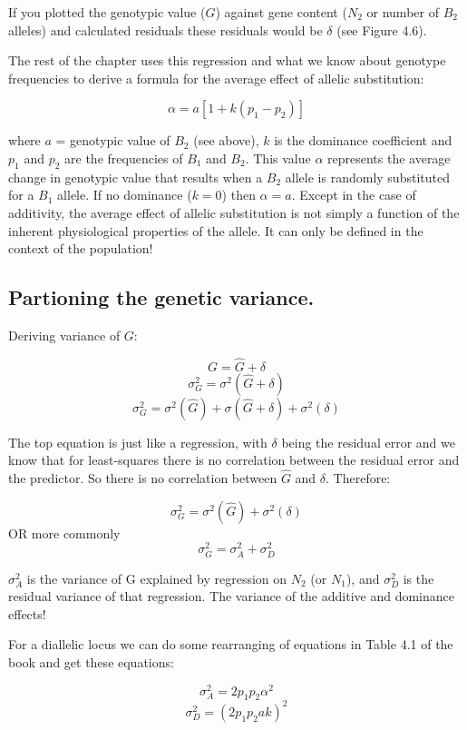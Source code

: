\documentclass[
]{article}
\begin{document}
If you plotted the genotypic value (\(G\)) against gene content (\(N_2\)
or number of \(B_2\) alleles) and calculated residuals these residuals
would be \(\delta\) (see Figure 4.6).

The rest of the chapter uses this regression and what we know about
genotype frequencies to derive a formula for the average effect of
allelic substitution:

\[ \alpha = a[1 + k(p_1 - p_2)] \]

where \(a\) = genotypic value of \(B_2\) (see above), \(k\) is the
dominance coefficient and \(p_1\) and \(p_2\) are the frequencies of
\(B_1\) and \(B_2\). This value \(\alpha\) represents the average change
in genotypic value that results when a \(B_2\) allele is randomly
substituted for a \(B_1\) allele. If no dominance (\(k = 0\)) then
\(\alpha = a\). Except in the case of additivity, the average effect of
allelic substitution is not simply a function of the inherent
physiological properties of the allele. It can only be defined in the
context of the population!

\hypertarget{partioning-the-genetic-variance.}{%
\subsection{Partioning the genetic
variance.}\label{partioning-the-genetic-variance.}}

Deriving variance of \(G\):

\[ G = \hat{G} + \delta \] \[ \sigma^2_G = \sigma^2(\hat{G} + \delta) \]
\[ \sigma^2_G = \sigma^2(\hat{G}) + \sigma(\hat{G} + \delta) + \sigma^2(\delta) \]

The top equation is just like a regression, with \(\delta\) being the
residual error and we know that for least-squares there is no
correlation between the residual error and the predictor. So there is no
correlation between \(\hat{G}\) and \(\delta\). Therefore:

\[ \sigma^2_G = \sigma^2(\hat{G}) + \sigma^2(\delta) \] OR more commonly
\[ \sigma^2_G = \sigma^2_A + \sigma^2_D \]

\(\sigma^2_A\) is the variance of G explained by regression on \(N_2\)
(or \(N_1\)), and \(\sigma^2_D\) is the residual variance of that
regression. The variance of the additive and dominance effects!

For a diallelic locus we can do some rearranging of equations in Table
4.1 of the book and get these equations:

\[ \sigma^2_A = 2p_1p_2\alpha^2 \] \[ \sigma^2_D = (2p_1p_2ak)^2 \]
\end{document}
